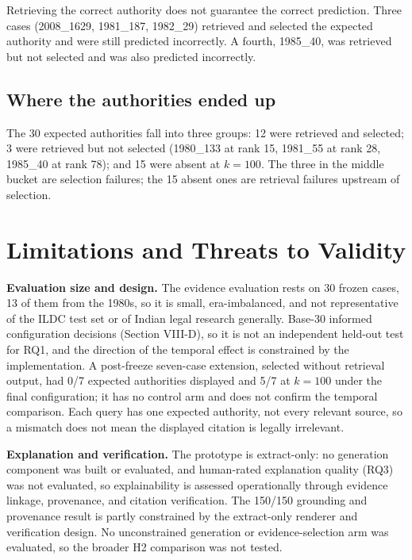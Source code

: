 \documentclass[conference]{IEEEtran}
\begin{document}
Retrieving the correct authority does not guarantee the correct prediction. Three cases (2008\_1629, 1981\_187, 1982\_29) retrieved and selected the expected authority and were still predicted incorrectly. A fourth, 1985\_40, was retrieved but not selected and was also predicted incorrectly.

\subsection{Where the authorities ended up}
The 30 expected authorities fall into three groups: 12 were retrieved and selected; 3 were retrieved but not selected (1980\_133 at rank 15, 1981\_55 at rank 28, 1985\_40 at rank 78); and 15 were absent at $k=100$. The three in the middle bucket are selection failures; the 15 absent ones are retrieval failures upstream of selection.

\section{Limitations and Threats to Validity}
\textbf{Evaluation size and design.} The evidence evaluation rests on 30 frozen cases, 13 of them from the 1980s, so it is small, era-imbalanced, and not representative of the ILDC test set or of Indian legal research generally. Base-30 informed configuration decisions (Section VIII-D), so it is not an independent held-out test for RQ1, and the direction of the temporal effect is constrained by the implementation. A post-freeze seven-case extension, selected without retrieval output, had 0/7 expected authorities displayed and 5/7 at $k=100$ under the final configuration; it has no control arm and does not confirm the temporal comparison. Each query has one expected authority, not every relevant source, so a mismatch does not mean the displayed citation is legally irrelevant.

\textbf{Explanation and verification.} The prototype is extract-only: no generation component was built or evaluated, and human-rated explanation quality (RQ3) was not evaluated, so explainability is assessed operationally through evidence linkage, provenance, and citation verification. The 150/150 grounding and provenance result is partly constrained by the extract-only renderer and verification design. No unconstrained generation or evidence-selection arm was evaluated, so the broader H2 comparison was not tested.
\end{document}
